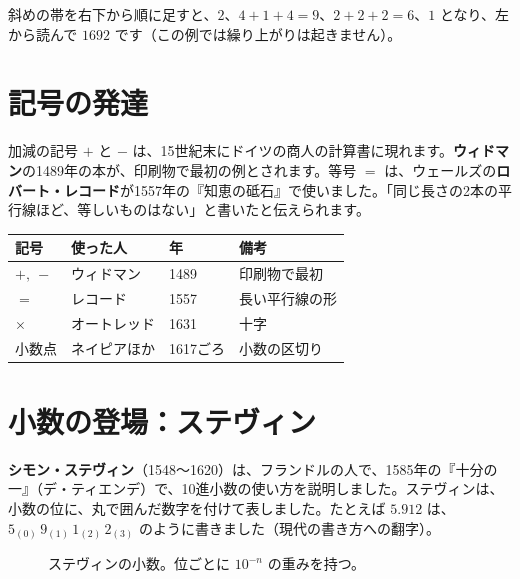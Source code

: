 \documentclass[a4paper,11pt,openany]{ltjsbook}
\begin{document}
斜めの帯を右下から順に足すと、$2$、$4+1+4=9$、$2+2+2=6$、$1$ となり、左から読んで $1692$ です（この例では繰り上がりは起きません）。

\section{記号の発達}

加減の記号 $+$ と $-$ は、15世紀末にドイツの商人の計算書に現れます。\textbf{ウィドマン}の1489年の本が、印刷物で最初の例とされます。等号 $=$ は、ウェールズの\textbf{ロバート・レコード}が1557年の『知恵の砥石』で使いました。「同じ長さの2本の平行線ほど、等しいものはない」と書いたと伝えられます。

\begin{center}
\begin{tabular}{llll}
\toprule
記号 & 使った人 & 年 & 備考\\
\midrule
$+,\ -$ & ウィドマン & 1489 & 印刷物で最初\\
$=$ & レコード & 1557 & 長い平行線の形\\
$\times$ & オートレッド & 1631 & 十字\\
小数点 & ネイピアほか & 1617ごろ & 小数の区切り\\
\bottomrule
\end{tabular}
\end{center}

\section{小数の登場：ステヴィン}

\textbf{シモン・ステヴィン}（1548〜1620）は、フランドルの人で、1585年の『十分の一』（デ・ティエンデ）で、10進小数の使い方を説明しました。ステヴィンは、小数の位に、丸で囲んだ数字を付けて表しました。たとえば $5.912$ は、$5_{(0)}\,9_{(1)}\,1_{(2)}\,2_{(3)}$ のように書きました（現代の書き方への翻字）。

\begin{figure}[htbp]
\centering
{}
\caption{ステヴィンの小数。位ごとに $10^{-n}$ の重みを持つ。}
\end{figure}
\end{document}
